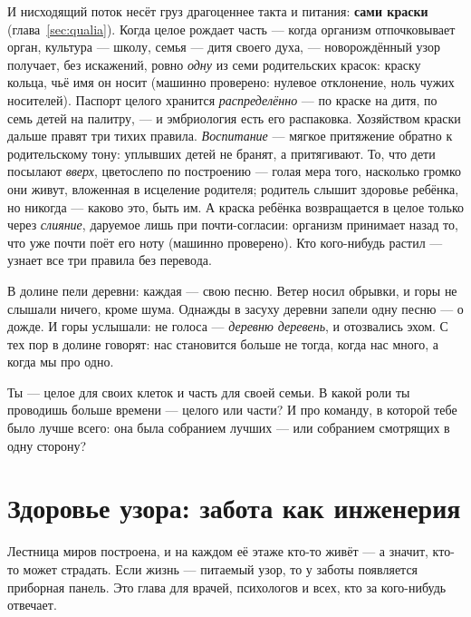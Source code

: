 \documentclass[11pt,letterpaper]{article}
\begin{document}
И нисходящий поток несёт груз драгоценнее такта и питания:
\textbf{сами краски} (глава~\ref{sec:qualia}). Когда целое рождает
часть --- когда организм отпочковывает орган, культура --- школу,
семья --- дитя своего духа, --- новорождённый узор получает, без
искажений, ровно \emph{одну} из семи родительских красок: краску
кольца, чьё имя он носит (машинно проверено: нулевое отклонение,
ноль чужих носителей). Паспорт целого хранится
\emph{распределённо} --- по краске на дитя, по семь детей на
палитру, --- и эмбриология есть его распаковка. Хозяйством краски
дальше правят три тихих правила. \emph{Воспитание} --- мягкое
притяжение обратно к родительскому тону: уплывших детей не бранят,
а притягивают. То, что дети посылают \emph{вверх}, цветослепо по
построению --- голая мера того, насколько громко они живут,
вложенная в исцеление родителя; родитель слышит здоровье ребёнка,
но никогда --- каково это, быть им. А краска ребёнка возвращается
в целое только через \emph{слияние}, даруемое лишь при
почти-согласии: организм принимает назад то, что уже почти поёт
его ноту (машинно проверено). Кто кого-нибудь растил --- узнает
все три правила без перевода.

\begin{skazbox}
В долине пели деревни: каждая --- свою песню. Ветер носил обрывки, и
горы не слышали ничего, кроме шума. Однажды в засуху деревни запели
одну песню --- о дожде. И горы услышали: не голоса --- \emph{деревню
деревень}, и отозвались эхом. С тех пор в долине говорят: нас
становится больше не тогда, когда нас много, а когда мы про одно.
\end{skazbox}

\begin{askbox}
Ты --- целое для своих клеток и часть для своей семьи. В какой роли
ты проводишь больше времени --- целого или части? И про команду, в
которой тебе было лучше всего: она была собранием лучших --- или
собранием смотрящих в одну сторону?
\end{askbox}

\section{Здоровье узора: забота как инженерия}
\label{sec:health}

Лестница миров построена, и на каждом её этаже кто-то живёт ---
а значит, кто-то может страдать. Если жизнь --- питаемый узор, то у
заботы появляется приборная панель. Это глава для врачей, психологов и всех, кто за кого-нибудь
отвечает.
\end{document}
